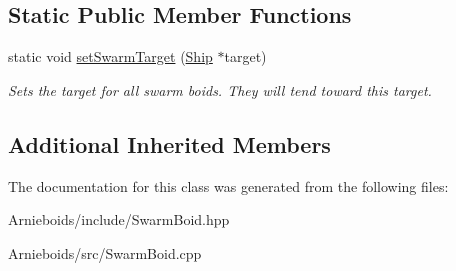 \subsection*{Static Public Member Functions}
\begin{DoxyCompactItemize}
\item 
\hypertarget{class_swarm_boid_ad80d43f4292e271fe923e336e4a00fc9}{}static void \hyperlink{class_swarm_boid_ad80d43f4292e271fe923e336e4a00fc9}{set\+Swarm\+Target} (\hyperlink{class_ship}{Ship} $\ast$target)\label{class_swarm_boid_ad80d43f4292e271fe923e336e4a00fc9}

\begin{DoxyCompactList}\small\item\em Sets the target for all swarm boids. They will tend toward this target. \end{DoxyCompactList}\end{DoxyCompactItemize}
\subsection*{Additional Inherited Members}


The documentation for this class was generated from the following files\+:\begin{DoxyCompactItemize}
\item 
Arnieboids/include/Swarm\+Boid.\+hpp\item 
Arnieboids/src/Swarm\+Boid.\+cpp\end{DoxyCompactItemize}
